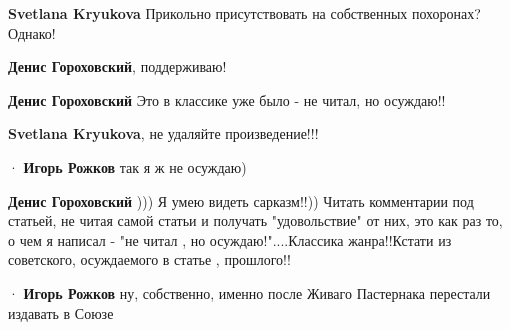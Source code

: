 \begin{itemize}
\begin{itemize}
\textbf{Svetlana Kryukova} Прикольно присутствовать на собственных похоронах? Однако!

 
\textbf{Денис Гороховский}, поддерживаю! 🤣

 
\textbf{Денис Гороховский} Это в классике уже было - не читал, но осуждаю!!

 
\textbf{Svetlana Kryukova}, не удаляйте произведение!!!

 
  · 
\textbf{Игорь Рожков} так я ж не осуждаю)

 
\textbf{Денис Гороховский} ))) Я умею видеть сарказм!!)) Читать комментарии под статьей, не читая самой статьи и получать "удовольствие" от них, это как раз то, о чем я написал - "не читал , но осуждаю!"....Классика жанра!!Кстати из советского, осуждаемого в статье , прошлого!!

 
  · 
\textbf{Игорь Рожков} ну, собственно, именно после Живаго Пастернака перестали издавать в Союзе


\end{itemize}
\end{itemize}
